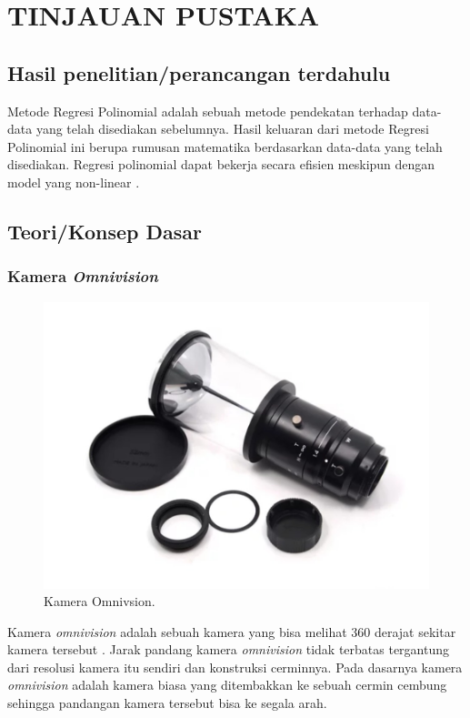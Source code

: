 \chapter{TINJAUAN PUSTAKA}
\label{chap:tinjauanpustaka}

\section{Hasil penelitian/perancangan terdahulu}
Metode Regresi Polinomial adalah sebuah metode pendekatan terhadap data-data yang telah disediakan sebelumnya. Hasil keluaran dari metode Regresi Polinomial ini berupa rumusan matematika berdasarkan data-data yang telah disediakan. Regresi polinomial dapat bekerja secara efisien meskipun dengan model yang non-linear 
\parencite{ref_regresi}.

\section{Teori/Konsep Dasar}

\subsection{Kamera \emph{Omnivision}}
\label{sec:omnivision}
\begin{figure}[H]
    \centering
  
    \includegraphics[scale=0.20]{gambar/omnivisino2.jpeg}
  
    \caption{Kamera Omnivsion.}
    \label{fig:omnivision}
\end{figure}
Kamera \emph{omnivision} adalah sebuah kamera yang bisa melihat 360 derajat sekitar 
kamera tersebut \parencite{ref_kamera_omni}. 
Jarak pandang kamera \emph{omnivision} tidak terbatas 
tergantung dari resolusi kamera itu sendiri dan 
konstruksi cerminnya. Pada dasarnya kamera \emph{omnivision} 
adalah kamera biasa yang ditembakkan ke sebuah cermin cembung 
sehingga pandangan kamera tersebut bisa ke segala arah. 

